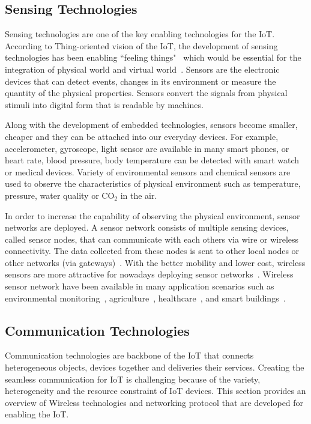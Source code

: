 \subsection{Sensing Technologies}

Sensing technologies are one of the key enabling technologies for the IoT.
According to Thing-oriented vision of the IoT, the development of sensing technologies has been enabling ``feeling things"~\citep{Minerva:2015} which would be essential for the integration of physical world and virtual world~\citep{Vermesan:2011}. 
Sensors are the electronic devices that can detect events, changes in its environment or measure the quantity of the physical properties.
Sensors convert the signals from physical stimuli into digital form that is readable by machines. 

Along with the development of embedded technologies, sensors become smaller, cheaper and they can be attached into our everyday devices.
For example, accelerometer, gyroscope, light sensor are available in many smart phones, or heart rate, blood pressure, body temperature can be detected with smart watch or medical devices. 
Variety of environmental sensors and chemical sensors are used to observe the characteristics of physical environment such as temperature, pressure, water quality or CO$_{2}$ in the air.


In order to increase the capability of observing the physical environment, sensor networks are deployed.
A sensor network consists of multiple sensing devices, called sensor nodes, that can communicate with each others via wire or wireless connectivity.
The data collected from these nodes is sent to other local nodes or other networks (via gateways)~\citep{Akyildiz:2010}.
With the better mobility and lower cost, wireless sensors are more attractive for nowadays deploying sensor networks~\citep{Sheng:2015}.
Wireless sensor network have been available in many application scenarios such as environmental monitoring~\citep{Lazarescu:2013}, agriculture~\citep{Ojha:2015}, healthcare~\citep{Catarinucci:2015}, and smart buildings~\citep{Ghayvat:2015}.

\subsection{Communication Technologies}

Communication technologies are backbone of the IoT that connects heterogeneous objects, devices together and deliveries their services.
Creating the seamless communication for IoT is challenging because of the variety, heterogeneity and the resource constraint of IoT devices.
This section provides an overview of Wireless technologies and networking protocol that are developed for enabling the IoT.


